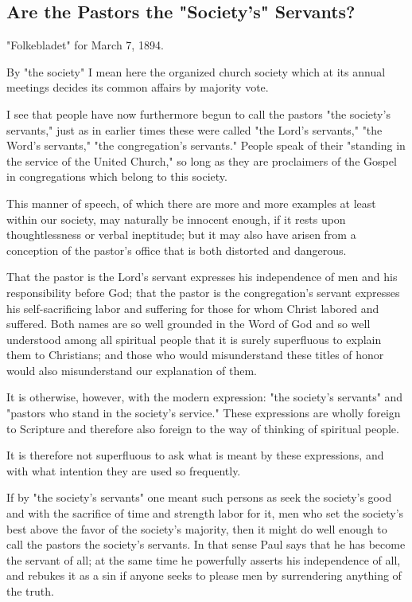 
\subsection{Are the Pastors the "Society’s" Servants?}

"Folkebladet" for March 7, 1894.


By "the society" I mean here the organized church society which at its annual meetings decides its common affairs by majority vote.

I see that people have now furthermore begun to call the pastors "the society’s servants," just as in earlier times these were called "the Lord’s servants," "the Word’s servants," "the congregation’s servants." People speak of their "standing in the service of the United Church," so long as they are proclaimers of the Gospel in congregations which belong to this society.

This manner of speech, of which there are more and more examples at least within our society, may naturally be innocent enough, if it rests upon thoughtlessness or verbal ineptitude; but it may also have arisen from a conception of the pastor’s office that is both distorted and dangerous.

That the pastor is the Lord’s servant expresses his independence of men and his responsibility before God; that the pastor is the congregation’s servant expresses his self-sacrificing labor and suffering for those for whom Christ labored and suffered. Both names are so well grounded in the Word of God and so well understood among all spiritual people that it is surely superfluous to explain them to Christians; and those who would misunderstand these titles of honor would also misunderstand our explanation of them.

It is otherwise, however, with the modern expression: "the society’s servants" and "pastors who stand in the society’s service." These expressions are wholly foreign to Scripture and therefore also foreign to the way of thinking of spiritual people.

It is therefore not superfluous to ask what is meant by these expressions, and with what intention they are used so frequently.

If by "the society’s servants" one meant such persons as seek the society’s good and with the sacrifice of time and strength labor for it, men who set the society’s best above the favor of the society’s majority, then it might do well enough to call the pastors the society’s servants. In that sense Paul says that he has become the servant of all; at the same time he powerfully asserts his independence of all, and rebukes it as a sin if anyone seeks to please men by surrendering anything of the truth.

